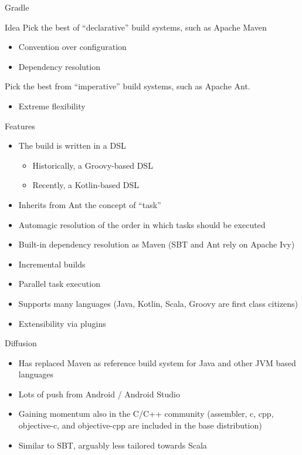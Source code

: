 \documentclass[presentation]{beamer}
\begin{document}
\begin{frame}{Gradle}
	\begin{block}{Idea}
		Pick the best of ``declarative'' build systems, such as Apache Maven
		\begin{itemize}
			\item Convention over configuration
			\item Dependency resolution
		\end{itemize}
		Pick the best from ``imperative'' build systems, such as Apache Ant.
		\begin{itemize}
			\item Extreme flexibility
		\end{itemize}
	\end{block}
	\begin{block}{Features}
		\begin{itemize}
			\item The build is written in a DSL
			\begin{itemize}
				\item Historically, a Groovy-based DSL
				\item Recently, a Kotlin-based DSL
			\end{itemize}
			\item Inherits from Ant the concept of ``task''
			\item Automagic resolution of the order in which tasks should be executed
			\item Built-in dependency resolution as Maven (SBT and Ant rely on Apache Ivy)
			\item Incremental builds
			\item Parallel task execution
			\item Supports many languages (Java, Kotlin, Scala, Groovy are first class citizens)
			\item Extensibility via plugins
		\end{itemize}
	\end{block}
	\begin{block}{Diffusion}
		\begin{itemize}
			\item Has replaced Maven as reference build system for Java and other JVM based languages
			\item Lots of push from Android / Android Studio
			\item Gaining momentum also in the C/C++ community (assembler, c, cpp, objective-c, and objective-cpp are included in the base distribution)
			\item Similar to SBT, arguably less tailored towards Scala

\end{itemize}
\end{block}
\end{frame}
\end{document}
